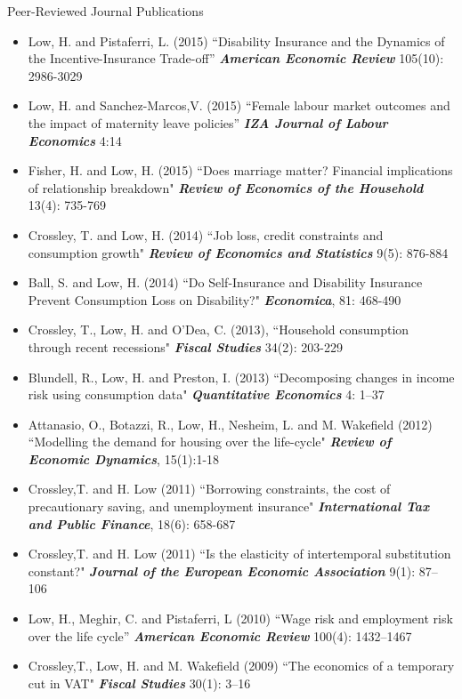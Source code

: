 \documentclass{resume} %
\begin{document}
\begin{rSection}{Peer-Reviewed Journal Publications}
\begin{itemize}
\item Low, H. and Pistaferri, L. (2015) ``Disability Insurance and the Dynamics of the Incentive-Insurance Trade-off” \textit{\textbf{American Economic Review}}  105(10): 2986-3029

\item Low, H. and Sanchez-Marcos,V. (2015) ``Female labour market outcomes and the impact of maternity leave policies” \textit{\textbf{IZA Journal of Labour Economics}} 4:14
\item Fisher, H. and Low, H. (2015) ``Does marriage matter? Financial implications of relationship breakdown" \textit{\textbf{Review of Economics of the Household}} 13(4): 735-769
\item Crossley, T. and Low, H. (2014) ``Job loss, credit constraints and consumption growth" \textit{\textbf{Review of Economics and Statistics}} 9(5): 876-884
\item Ball, S. and Low, H. (2014) ``Do Self-Insurance and Disability Insurance Prevent Consumption Loss on Disability?" \textit{\textbf{Economica}}, 81: 468-490
\item Crossley, T., Low, H. and O'Dea, C. (2013), ``Household consumption through recent recessions" \textit{\textbf{Fiscal Studies}} 34(2): 203-229 
\item Blundell, R., Low, H. and Preston, I. (2013) ``Decomposing changes in income risk using consumption data" \textit{\textbf{Quantitative Economics}} 4: 1--37
\item Attanasio, O., Botazzi, R., Low, H., Nesheim, L. and M. Wakefield (2012) ``Modelling the demand for housing over the life-cycle" \textit{\textbf{Review of Economic Dynamics}}, 15(1):1-18 
\item Crossley,T. and H. Low (2011) ``Borrowing constraints, the cost of precautionary saving, and unemployment insurance" \textit{\textbf{International Tax and Public Finance}}, 18(6): 658-687
\item Crossley,T. and H. Low (2011) ``Is the elasticity of intertemporal substitution constant?" \textit{\textbf{Journal of the European Economic Association}} 9(1): 87--106

\item Low, H., Meghir, C. and Pistaferri, L (2010) ``Wage risk and employment risk over the life cycle” \textit{\textbf{American Economic Review}} 100(4): 1432--1467
\item Crossley,T., Low, H. and M. Wakefield (2009) ``The economics of a temporary cut in VAT" \textit{\textbf{Fiscal Studies}} 30(1): 3--16


\end{itemize}
\end{rSection}
\end{document}
